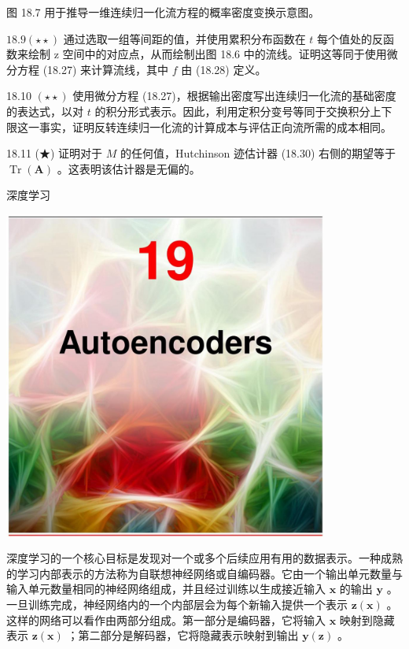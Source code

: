 \documentclass[10pt]{article}
\begin{document}
图 18.7 用于推导一维连续归一化流方程的概率密度变换示意图。

\({18.9}\left( {\star  \star  }\right)\) 通过选取一组等间距的值，并使用累积分布函数在 \(t\) 每个值处的反函数来绘制 z 空间中的对应点，从而绘制出图 18.6 中的流线。证明这等同于使用微分方程 (18.27) 来计算流线，其中 \(f\) 由 (18.28) 定义。

18.10 \(\left( {\star  \star  }\right)\) 使用微分方程 (18.27)，根据输出密度写出连续归一化流的基础密度的表达式，以对 \(t\) 的积分形式表示。因此，利用定积分变号等同于交换积分上下限这一事实，证明反转连续归一化流的计算成本与评估正向流所需的成本相同。

18.11 (★) 证明对于 \(M\) 的任何值，Hutchinson 迹估计器 (18.30) 右侧的期望等于 \(\operatorname{Tr}\left( \mathbf{A}\right)\) 。这表明该估计器是无偏的。

深度学习

\begin{center}
\includegraphics[max width=0.8\textwidth]{images/0194e279-9b28-703a-88f4-c3ac21e2010d_582_474_349_1074_1088_0.jpg}
\end{center}
\hspace*{3em} 

深度学习的一个核心目标是发现对一个或多个后续应用有用的数据表示。一种成熟的学习内部表示的方法称为自联想神经网络或自编码器。它由一个输出单元数量与输入单元数量相同的神经网络组成，并且经过训练以生成接近输入 \(\mathbf{x}\) 的输出 \(\mathbf{y}\) 。一旦训练完成，神经网络内的一个内部层会为每个新输入提供一个表示 \(\mathbf{z}\left( \mathbf{x}\right)\) 。这样的网络可以看作由两部分组成。第一部分是编码器，它将输入 \(\mathbf{x}\) 映射到隐藏表示 \(\mathbf{z}\left( \mathbf{x}\right)\) ；第二部分是解码器，它将隐藏表示映射到输出 \(\mathbf{y}\left( \mathbf{z}\right)\) 。
\end{document}
